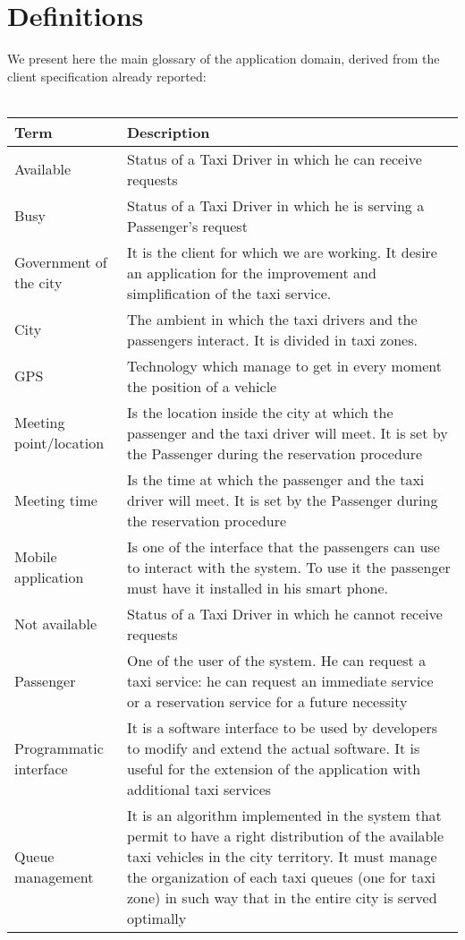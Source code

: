 \section{Definitions}
We present here the main glossary of the application domain, derived from the client specification already reported: \\ \\
\begin{center}
\begin{longtable}{| p{} | p{} |} \hline
{\Large \textbf{Term}} & {\Large \textbf{Description}} \\ \hline
Available & Status of a Taxi Driver in which he can receive requests \\ \hline
Busy & Status of a Taxi Driver in which he is serving a Passenger's request \\ \hline
Government of the city & It is the client for which we are working.  It desire an application for the improvement and simplification of the taxi service. \\ \hline
City & The ambient in which the taxi drivers and the passengers interact. It is divided in taxi zones. \\ \hline
GPS & Technology which manage to get in every moment the position of a vehicle \\ \hline
Meeting point/location & Is the location inside the city at which the passenger and the taxi driver will meet. It is set by the Passenger during the reservation procedure \\ \hline
Meeting time & Is the time at which the passenger and the taxi driver will meet. It is set by the Passenger during the reservation procedure\\ \hline
Mobile application & Is one of the interface that the passengers can use to interact with the system. To use it the passenger must have it installed in his smart phone. \\ \hline
Not available & Status of a Taxi Driver in which he cannot receive requests \\ \hline
Passenger & One of the user of the system. He can request a taxi service: he can request an immediate service or a reservation service for a future necessity \\ \hline
Programmatic interface & It is a software interface to be used by developers to modify and extend the actual software. It is useful for the extension of the application with additional taxi services \\ \hline
Queue management & It is an algorithm implemented in the system that permit to have a right distribution of the available taxi vehicles in the city territory. It must manage the organization of each taxi queues (one for taxi zone) in such way that in the entire city is served optimally \\ \hline

\end{longtable}
\end{center}
